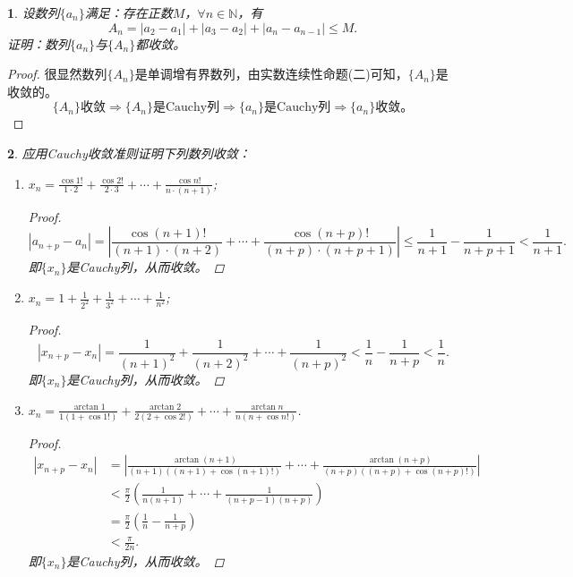 \documentclass[utf8]{book}
\newtheorem{example}{}[section]             %
\begin{document}
\begin{example}
设数列$\{a_n\}$满足：存在正数$M$，$\forall n\in\mathbb{N}$，有$$A_n = \left|a_2-a_1 \right| +\left|a_3-a_2 \right| + \left|a_n-a_{n-1} \right| \leq M.$$
证明：数列$\{a_n\}$与$\{A_n\}$都收敛。
\end{example}
\begin{proof}
很显然数列$\{A_n\}$是单调增有界数列，由实数连续性命题(二)可知，$\{A_n\}$是收敛的。
$$\{A_n\}\text{收敛}\Rightarrow \{A_n\}\text{是Cauchy列}\Rightarrow \{a_n\}\text{是Cauchy列} \Rightarrow \{a_n\}\text{收敛}。$$
\end{proof}
\begin{example}
应用Cauchy收敛准则证明下列数列收敛：
\renewcommand\labelenumi{\normalfont(\theenumi)}
\begin{enumerate}
\item $\displaystyle x_n=\frac{\cos{1!}}{1\cdot 2}+\frac{\cos{2!}}{2\cdot 3}+\cdots+\frac{\cos{n!}}{n\cdot (n+1)}$;
\begin{proof}
$$\left|a_{n+p} - a_{n}\right| = \left|\frac{\cos{(n+1)!}}{(n+1)\cdot (n+2)}+\cdots+\frac{\cos{(n+p)!}}{(n+p)\cdot (n+p+1)}\right|\leq 
\frac{1}{n+1} - \frac{1}{n+p+1} < \frac{1}{n+1}.$$
即$\{x_n\}$是Cauchy列，从而收敛。
\end{proof}
\item $\displaystyle x_n=1+\frac{1}{2^2}+\frac{1}{3^2}+\cdots+\frac{1}{n^2}$;
\begin{proof}
$$\left|x_{n+p}-x_n\right| = \frac{1}{(n+1)^2}+\frac{1}{(n+2)^2}+\cdots+\frac{1}{(n+p)^2}<\frac{1}{n}-\frac{1}{n+p}<
\frac{1}{n}.$$
即$\{x_n\}$是Cauchy列，从而收敛。
\end{proof}
\item $\displaystyle x_n = \frac{\arctan{1}}{1(1+\cos{1!})}+\frac{\arctan{2}}{2(2+\cos{2!})}+\cdots+\frac{\arctan{n}}{n(n+\cos{n!})}$.
\begin{proof}
\begin{equation*}
\begin{split}
\left|x_{n+p}-x_{n}\right| &= \left|\frac{\arctan{(n+1)}}{(n+1)((n+1)+\cos{(n+1)!})}+\cdots+\frac{\arctan{(n+p)}}{(n+p)((n+p)+\cos{(n+p)!})}\right| \\
&<\frac{\pi}{2}\left(\frac{1}{n(n+1)}+\cdots+\frac{1}{(n+p-1)(n+p)}\right)\\
&=\frac{\pi}{2}\left(\frac{1}{n}-\frac{1}{n+p}\right)\\
&<\frac{\pi}{2n}.
\end{split}
\end{equation*}
即$\{x_n\}$是Cauchy列，从而收敛。
\end{proof}
\end{enumerate}
\end{example}
\end{document}
